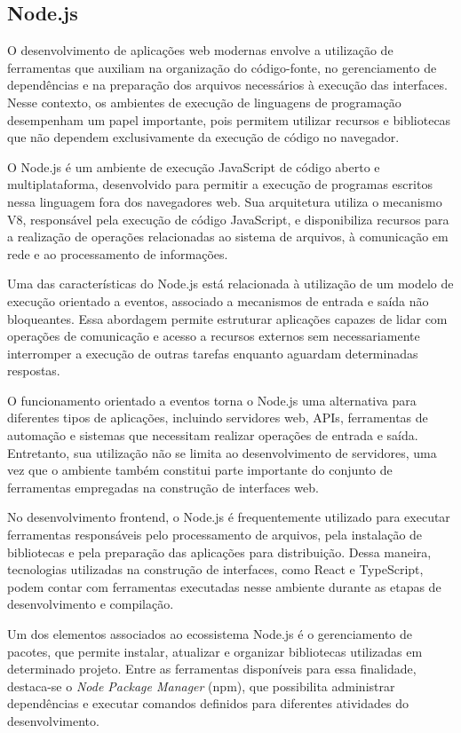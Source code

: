 \subsection{Node.js}

O desenvolvimento de aplicações web modernas envolve a utilização de ferramentas que auxiliam na organização do código-fonte, no gerenciamento de dependências e na preparação dos arquivos necessários à execução das interfaces. Nesse contexto, os ambientes de execução de linguagens de programação desempenham um papel importante, pois permitem utilizar recursos e bibliotecas que não dependem exclusivamente da execução de código no navegador.

O Node.js é um ambiente de execução JavaScript de código aberto e multiplataforma, desenvolvido para permitir a execução de programas escritos nessa linguagem fora dos navegadores web. Sua arquitetura utiliza o mecanismo V8, responsável pela execução de código JavaScript, e disponibiliza recursos para a realização de operações relacionadas ao sistema de arquivos, à comunicação em rede e ao processamento de informações.

Uma das características do Node.js está relacionada à utilização de um modelo de execução orientado a eventos, associado a mecanismos de entrada e saída não bloqueantes. Essa abordagem permite estruturar aplicações capazes de lidar com operações de comunicação e acesso a recursos externos sem necessariamente interromper a execução de outras tarefas enquanto aguardam determinadas respostas.

O funcionamento orientado a eventos torna o Node.js uma alternativa para diferentes tipos de aplicações, incluindo servidores web, APIs, ferramentas de automação e sistemas que necessitam realizar operações de entrada e saída. Entretanto, sua utilização não se limita ao desenvolvimento de servidores, uma vez que o ambiente também constitui parte importante do conjunto de ferramentas empregadas na construção de interfaces web.

No desenvolvimento frontend, o Node.js é frequentemente utilizado para executar ferramentas responsáveis pelo processamento de arquivos, pela instalação de bibliotecas e pela preparação das aplicações para distribuição. Dessa maneira, tecnologias utilizadas na construção de interfaces, como React e TypeScript, podem contar com ferramentas executadas nesse ambiente durante as etapas de desenvolvimento e compilação.

Um dos elementos associados ao ecossistema Node.js é o gerenciamento de pacotes, que permite instalar, atualizar e organizar bibliotecas utilizadas em determinado projeto. Entre as ferramentas disponíveis para essa finalidade, destaca-se o \textit{Node Package Manager} (npm), que possibilita administrar dependências e executar comandos definidos para diferentes atividades do desenvolvimento.

